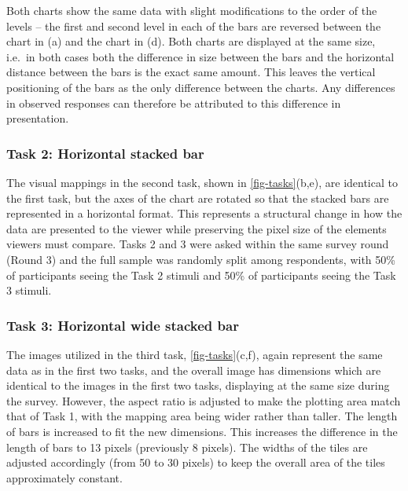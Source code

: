 \documentclass[
]{jds}
\begin{document}
Both charts show the same data with slight modifications to the order of
the levels -- the first and second level in each of the bars are
reversed between the chart in (a) and the chart in (d). Both charts are
displayed at the same size, i.e.~in both cases both the difference in
size between the bars and the horizontal distance between the bars is
the exact same amount. This leaves the vertical positioning of the bars
as the only difference between the charts. Any differences in observed
responses can therefore be attributed to this difference in
presentation.

\hypertarget{task-2-horizontal-stacked-bar}{%
\subsubsection{Task 2: Horizontal stacked
bar}\label{task-2-horizontal-stacked-bar}}

The visual mappings in the second task, shown in
\autoref{fig-tasks}(b,e), are identical to the first task, but the axes
of the chart are rotated so that the stacked bars are represented in a
horizontal format. This represents a structural change in how the data
are presented to the viewer while preserving the pixel size of the
elements viewers must compare. Tasks 2 and 3 were asked within the same
survey round (Round 3) and the full sample was randomly split among
respondents, with 50\% of participants seeing the Task 2 stimuli and
50\% of participants seeing the Task 3 stimuli.

\hypertarget{task-3-horizontal-wide-stacked-bar}{%
\subsubsection{Task 3: Horizontal wide stacked
bar}\label{task-3-horizontal-wide-stacked-bar}}

The images utilized in the third task, \autoref{fig-tasks}(c,f), again
represent the same data as in the first two tasks, and the overall image
has dimensions which are identical to the images in the first two tasks,
displaying at the same size during the survey. However, the aspect ratio
is adjusted to make the plotting area match that of Task 1, with the
mapping area being wider rather than taller. The length of bars is
increased to fit the new dimensions. This increases the difference in
the length of bars to 13 pixels (previously 8 pixels). The widths of the
tiles are adjusted accordingly (from 50 to 30 pixels) to keep the
overall area of the tiles approximately constant.
\end{document}
